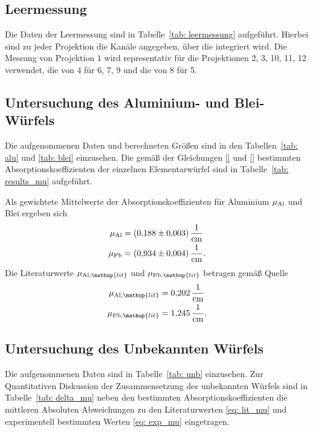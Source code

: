 \subsection{Leermessung}
Die Daten der Leermessung sind in Tabelle~\ref{tab: leermessung} aufgeführt. Hierbei sind zu jeder Projektion
die Kanäle angegeben, über die integriert wird. Die Messung von Projektion $1$ wird representativ für die
Projektionen 2, 3, 10, 11, 12 verwendet, die von $4$ für 6, 7, 9 und die von $8$ für 5.


\subsection{Untersuchung des Aluminium- und Blei-Würfels}
Die aufgenommenen Daten und berechneten Größen sind in den Tabellen~\ref{tab: alu} und \ref{tab: blei} einzusehen.
Die gemäß der Gleichungen \eqref{} und \eqref{} bestimmten Absorptionskoeffizienten
der einzelnen Elementarwürfel sind in Tabelle~\ref{tab: results_mu} aufgeführt.
\FloatBarrier



Als gewichtete Mittelwerte der Absorptionskoeffizienten für Aluminium $\mu_{\ce{Al}}$ und Blei
ergeben sich
\begin{align}
  \begin{aligned}
  \mu_{\ce{Al}} &= \SI{0.188(3)}{\per\centi\meter}\\
  \mu_{\ce{Pb}} &= \SI{0.934(4)}{\per\centi\meter}.
  \label{eq: exp_mu}
\end{aligned}
\end{align}
Die Literaturwerte $\mu_{\ce{Al}, \mathup{lit}}$ und $\mu_{\ce{Pb}, \mathup{lit}}$ betragen gemäß Quelle \cite{}
\begin{align}
  \begin{aligned}
  \mu_{\ce{Al}, \mathup{lit}} &= \SI{0.202}{\per\centi\meter} \\
  \mu_{\ce{Pb}, \mathup{lit}} &= \SI{1.245}{\per\centi\meter}.
  \label{eq: lit_mu}
\end{aligned}
\end{align}

\FloatBarrier

\subsection{Untersuchung des Unbekannten Würfels}
Die aufgenommenen Daten sind in Tabelle~\ref{tab: unb} einzusehen. Zur Quantitativen Diskussion der Zusammensetzung
des unbekannten Würfels sind in Tabelle~\ref{tab: delta_mu} neben den bestimmten Absorptionskoeffizienten die mittleren Absoluten
Abweichungen zu den Literaturwerten \eqref{eq: lit_mu} und experimentell bestimmten Werten \eqref{eq: exp_mu} eingetragen.
\FloatBarrier



\FloatBarrier
